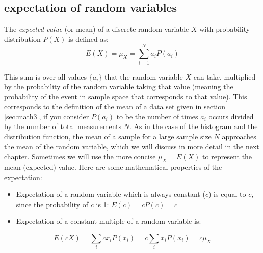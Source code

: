\documentclass[
  letterpaper,
  DIV=11,
  numbers=noendperiod]{scrreprt}
\providecommand{\tightlist}{%
  \setlength{\itemsep}{0pt}\setlength{\parskip}{0pt}}\usepackage{longtable,booktabs,array}
\begin{document}
\hypertarget{expectation-of-random-variables}{%
\subsection{expectation of random
variables}\label{expectation-of-random-variables}}

\begin{tcolorbox}[enhanced jigsaw, arc=.35mm, colframe=quarto-callout-note-color-frame, left=2mm, opacitybacktitle=0.6, breakable, title=\textcolor{quarto-callout-note-color}{\faInfo}\hspace{0.5em}{Note}, toprule=.15mm, coltitle=black, bottomtitle=1mm, toptitle=1mm, colback=white, leftrule=.75mm, colbacktitle=quarto-callout-note-color!10!white, titlerule=0mm, opacityback=0, rightrule=.15mm, bottomrule=.15mm]

The \emph{expected value} (or mean) of a discrete random variable \(X\)
with probability distribution \(P(X)\) is defined as:
\[ E(X) = \mu_X = \sum_{i=1}^N  a_i P(a_i)\]

\end{tcolorbox}

This sum is over all values \(\{a_i\}\) that the random variable \(X\)
can take, multiplied by the probability of the random variable taking
that value (meaning the probability of the event in sample space that
corresponds to that value). This corresponds to the definition of the
mean of a data set given in section \ref{sec:math3}, if you consider
\(P(a_i)\) to be the number of times \(a_i\) occurs divided by the
number of total measurements \(N\). As in the case of the histogram and
the distribution function, the mean of a sample for a large sample size
\(N\) approaches the mean of the random variable, which we will discuss
in more detail in the next chapter. Sometimes we will use the more
concise \(\mu_X = E(X)\) to represent the mean (expected) value. Here
are some mathematical properties of the expectation:

\begin{itemize}
\tightlist
\item
  Expectation of a random variable which is always constant (\(c\)) is
  equal to \(c\), since the probability of \(c\) is 1:
  \(E(c) = cP(c) = c\)
\item
  Expectation of a constant multiple of a random variable is:
\end{itemize}

\[E(cX) = \sum_i c x_iP(x_i) = c \sum_i x_iP(x_i) = c \mu_X\]
\end{document}
